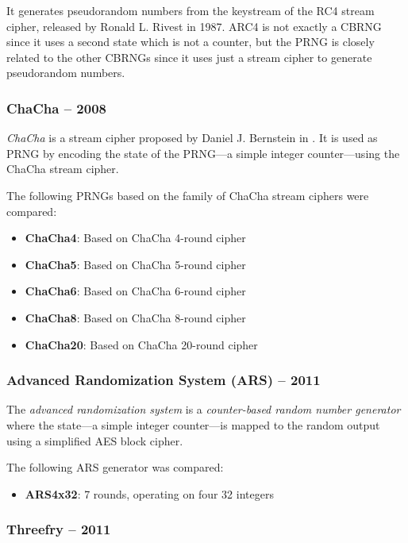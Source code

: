     It generates pseudorandom numbers from the keystream of the RC4 stream cipher, released by Ronald L. Rivest in 1987. ARC4 is not exactly a CBRNG since it uses a second state which is not a counter, but the PRNG is closely related to the other CBRNGs since it uses just a stream cipher to generate pseudorandom numbers.

\subsubsection[ChaCha -- 2008]{ChaCha -- 2008} \label{subsubsec:chacha}

    \emph{ChaCha} is a stream cipher proposed by Daniel J. Bernstein in \cite{Bernstein:2008}. It is used as PRNG by encoding the state of the PRNG---a simple integer counter---using the ChaCha stream cipher.

    The following PRNGs based on the family of ChaCha stream ciphers were compared:
    \begin{itemize}
        \itemsep0em
        \item \textbf{ChaCha4}: Based on ChaCha 4-round cipher
        \item \textbf{ChaCha5}: Based on ChaCha 5-round cipher
        \item \textbf{ChaCha6}: Based on ChaCha 6-round cipher
        \item \textbf{ChaCha8}: Based on ChaCha 8-round cipher
        \item \textbf{ChaCha20}: Based on ChaCha 20-round cipher
    \end{itemize}

\subsubsection[Advanced Randomization System (ARS) -- 2011]{Advanced Randomization System (ARS) -- 2011} \label{subsubsec:ars}

    The \emph{advanced randomization system} is a \emph{counter-based random number generator} where the state---a simple integer counter---is mapped to the random output using a simplified AES block cipher.

    The following ARS generator was compared:
    \begin{itemize}
		\itemsep0em
        \item \textbf{ARS4x32}: 7 rounds, operating on four \SI{32}{\bit} integers
    \end{itemize}

\subsubsection[Threefry -- 2011]{Threefry -- 2011} \label{subsubsec:threefry}

